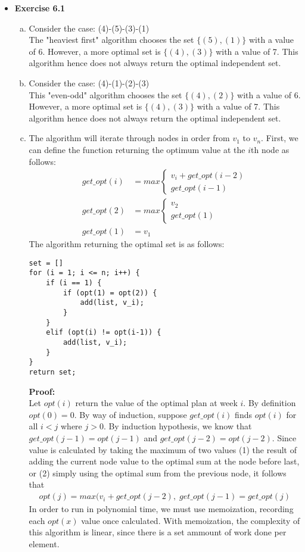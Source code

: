 \documentclass[a4paper]{article}
\begin{document}
\begin{itemize}
\item{\textbf{Exercise 6.1}}
\begin{enumerate}[a.]
\item Consider the case: (4)-(5)-(3)-(1) \\
The "heaviest first" algorithm chooses the set $\{(5), (1)\}$ with  a value of 6. However, a more optimal set is $\{(4),(3)\}$
 with a value of 7. This algorithm hence does not always return the optimal independent set.
 \item Consider the case: (4)-(1)-(2)-(3) \\
 This "even-odd" algorithm chooses the set $\{(4), (2)\}$ with a value of 6. However, a more optimal set is $\{(4), (3)\}$ with a value of 7. This algorithm hence does not always return the optimal independent set.
 \item The algorithm will iterate through nodes in order from $v_1$ to $v_n$. First, we can define the function returning the optimum value at the $i$th node as follows: 
\begin{align*}
 get\_opt(i) &= max
  \begin{cases}
   v_i + get\_opt(i-2) \\
   get\_opt(i-1)
  \end{cases} \\
 get\_opt(2) &= max
  \begin{cases}
   v_2 \\
   get\_opt(1)
  \end{cases} \\
  get\_opt(1) &= v_1
\end{align*}
The algorithm returning the optimal set is as follows:
\begin{verbatim}
set = []
for (i = 1; i <= n; i++) {
    if (i == 1) {
        if (opt(1) = opt(2)) {
        	add(list, v_i);
        }
    }
    elif (opt(i) != opt(i-1)) {
        add(list, v_i);
    }
}
return set;
\end{verbatim}
\textbf{Proof:} \\
Let $opt(i)$ return the value of the optimal plan at week $i$. By definition $opt(0) = 0$. By way of induction, suppose $get\_opt(i)$ finds $opt(i)$ for all $i <j$ where $j > 0$. By induction hypothesis, we know that $get\_opt(j-1) = opt(j-1)$ and $get\_opt(j-2) = opt(j-2)$. Since value is calculated by taking the maximum of two values (1) the result of adding the current node value to the optimal sum at the node before last, or (2) simply using the optimal sum from the previous node, it follows that 
\begin{align*}
opt(j) = max(v_i+get\_opt(j-2), \;get\_opt(j-1) = get\_opt(j)
\end{align*}
In order to run in polynomial time, we must use memoization, recording each $opt(x)$ value once calculated. With memoization, the complexity of this algorithm is linear, since there is a set ammount of work done per element. \\
\end{enumerate}


\end{itemize}
\end{document}
